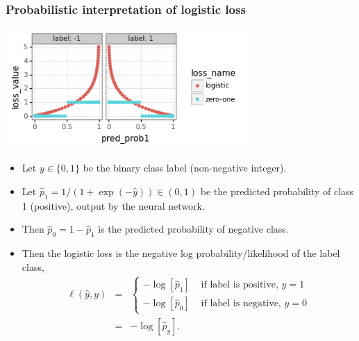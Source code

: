 \message{ !name(06-backprop.tex)}\documentclass{beamer}
\begin{document}
\begin{frame}
  \frametitle{Probabilistic interpretation of logistic loss}
  \includegraphics[width=0.7\textwidth]{2022-02-15-simplex-binary-loss-prob.png}

  \begin{itemize}
  \item Let $y\in\{0,1\}$ be the binary class label (non-negative integer).
  \item Let $\hat p_1=1/(1+\exp(-\hat y))\in (0,1)$ be the predicted probability
    of class 1 (positive), output by the neural network.
  \item Then $\hat p_0 = 1-\hat p_1$ is the predicted probability of
    negative class.
  \item Then the logistic loss is the negative log
    probability/likelihood of the label class,
    \begin{eqnarray*}
      \ell(\hat y, y) 
        &=& \begin{cases}
              -\log[\hat p_1] & \text{ if label is positive, } y=1 \\
              -\log[\hat p_0] & \text{ if label is negative, } y=0
            \end{cases}\\
        &=& -\log[\hat p_y].
    \end{eqnarray*}
  \end{itemize}

\end{frame}
\end{document}
